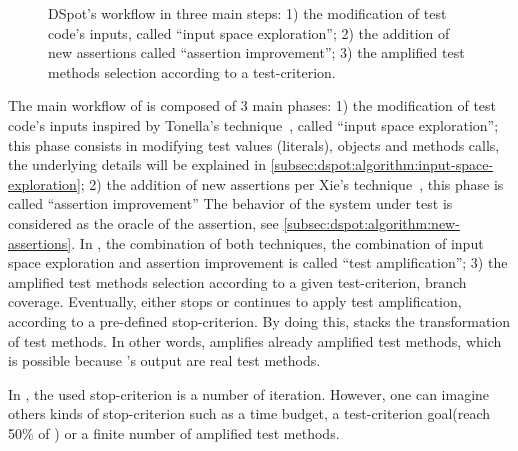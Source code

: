 \begin{figure}[h]
	\centering{}
	\caption{DSpot's workflow in three main steps: 
		1) the modification of test code's inputs, called ``input space exploration''; 
		2) the addition of new assertions called ``assertion improvement''; 
		3) the amplified test methods selection according to a test-criterion.
	}
	\label{fig:dspot-workflow}
\end{figure}

The main workflow of \dspot is composed of 3 main phases:
1) the modification of test code's inputs inspired by Tonella's technique~\cite{tonella}, called ``input space exploration''; 
this phase consists in modifying test values (\eg literals), objects and methods calls, the underlying details will be explained in \autoref{subsec:dspot:algorithm:input-space-exploration};
2) the addition of new assertions per Xie's technique~\cite{Xie2006}, this phase is called ``assertion improvement''
The behavior of the system under test is considered as the oracle of the assertion, see \autoref{subsec:dspot:algorithm:new-assertions}.
In \dspot, the combination of both techniques, \ie the combination of input space exploration and assertion improvement is called ``test amplification'';
3) the amplified test methods selection according to a given test-criterion, \eg branch coverage.
Eventually, \dspot either stops or continues to apply test amplification, according to a pre-defined stop-criterion.
By doing this, \dspot stacks the transformation of test methods.
In other words, \dspot amplifies already amplified test methods, which is possible because \dspot's output are real test methods.

In \dspot, the used stop-criterion is a number of iteration.
However, one can imagine others kinds of stop-criterion such as a time budget, a test-criterion goal(\eg reach 50\% of \ms) or a finite number of amplified test methods.

